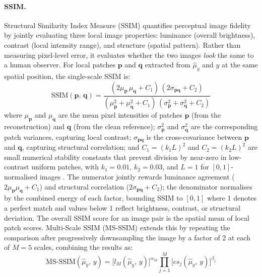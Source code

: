 \documentclass[12pt, a4paper, twoside, openright]{book}
\begin{document}
\paragraph{SSIM.}
Structural Similarity Index Measure (SSIM) \cite{wang_image_2004} quantifies perceptual
image fidelity by jointly evaluating three local image properties: luminance (overall
brightness), contrast (local intensity range), and structure (spatial pattern). Rather than
measuring pixel-level error, it evaluates whether the two images \emph{look} the same to a
human observer. For local patches $\mathbf{p}$ and $\mathbf{q}$ extracted from $\hat{\mu}_y$
and $y$ at the same spatial position, the single-scale SSIM is:
\begin{equation}
\label{eq:methods:ssim_single}
\mathrm{SSIM}(\mathbf{p},\,\mathbf{q})
  = \frac{(2\mu_{\mathbf{p}}\,\mu_{\mathbf{q}} + C_1)\,(2\sigma_{\mathbf{p}\mathbf{q}} + C_2)}
         {(\mu_{\mathbf{p}}^2 + \mu_{\mathbf{q}}^2 + C_1)\,(\sigma_{\mathbf{p}}^2 + \sigma_{\mathbf{q}}^2 + C_2)}
\end{equation}
where $\mu_{\mathbf{p}}$ and $\mu_{\mathbf{q}}$ are the mean pixel intensities of patches
$\mathbf{p}$ (from the reconstruction) and $\mathbf{q}$ (from the clean reference);
$\sigma_{\mathbf{p}}^2$ and $\sigma_{\mathbf{q}}^2$ are the corresponding patch variances,
capturing local contrast; $\sigma_{\mathbf{p}\mathbf{q}}$ is the cross-covariance between
$\mathbf{p}$ and $\mathbf{q}$, capturing structural correlation; and $C_1 = (k_1 L)^2$ and
$C_2 = (k_2 L)^2$ are small numerical stability constants that prevent division by near-zero
in low-contrast uniform patches, with $k_1 = 0.01$, $k_2 = 0.03$, and $L = 1$ for
$[0,1]$-normalised images \cite{wang_image_2004}. The numerator jointly rewards luminance
agreement ($2\mu_{\mathbf{p}}\mu_{\mathbf{q}} + C_1$) and structural correlation
($2\sigma_{\mathbf{p}\mathbf{q}} + C_2$); the denominator normalises by the combined
energy of each factor, bounding SSIM to $[0,1]$ where 1 denotes a perfect match and values
below 1 reflect brightness, contrast, or structural deviation. The overall SSIM score for
an image pair is the spatial mean of local patch scores. Multi-Scale SSIM
(MS-SSIM) \cite{wang_multiscale_2003} extends this by repeating the comparison after
progressively downsampling the image by a factor of 2 at each of $M = 5$ scales, combining
the results as:
\begin{equation}
\label{eq:methods:ms_ssim}
\mathrm{MS\text{-}SSIM}(\hat{\mu}_y,\,y)
  = \bigl[l_M(\hat{\mu}_y,\,y)\bigr]^{\alpha_M}
    \prod_{j=1}^{M}\bigl[cs_j(\hat{\mu}_y,\,y)\bigr]^{\beta_j}
\end{equation}
\end{document}
